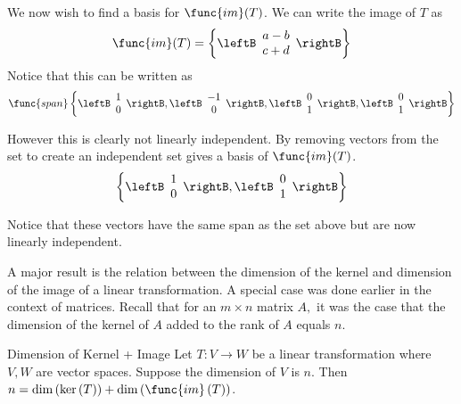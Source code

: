 \begin{solution}
We now wish to find a basis for $\func{im}(T)$. We can write the image of $T$ as 
\[
\func{im}(T) = \left\{ 
\leftB \begin{array}{c}
a - b  \\
c + d  
\end{array}
\rightB
\right\}
\]
Notice that this can be written as 
\[
\func{span}
\left\{
\leftB \begin{array}{c}
1 \\ 
0
\end{array}\rightB, 
\leftB \begin{array}{c}
-1 \\ 
0
\end{array}\rightB, 
\leftB \begin{array}{c}
0 \\ 
1
\end{array}\rightB, 
\leftB \begin{array}{c}
0 \\ 
1
\end{array}\rightB \right\}
\]

However this is clearly not linearly independent. By removing vectors from the set to create an independent set gives a basis of $\func{im}(T)$.
\[
\left\{
\leftB \begin{array}{c}
1 \\ 
0
\end{array}\rightB, 
\leftB \begin{array}{c}
0 \\ 
1
\end{array}\rightB
\right\}
\]

Notice that these vectors have the same span as the set above but are now linearly independent.
\end{solution}

A major result is the relation between the dimension of the kernel and
dimension of the image of a linear transformation. A special case was done
earlier in the context of matrices. Recall that for an $m\times n$ matrix $%
A, $ it was the case that the dimension of the kernel of $A$ added to the
rank of $A$ equals $n$. 

\begin{theorem}{Dimension of Kernel + Image}{}
Let $T:V\rightarrow W$ be a linear transformation where $V,W$ are vector
spaces. Suppose the dimension of $V$ is $n$.
Then $n=\dim \left( \ker \left( T\right) \right) +\dim \left( \func{im}
\left( T\right) \right) $.
\end{theorem}

